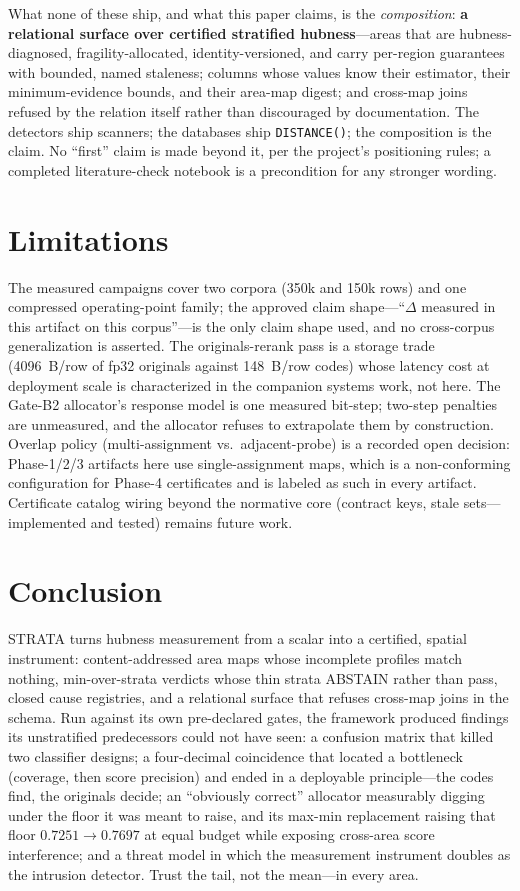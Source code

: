 \documentclass[sigconf, nonacm]{acmart}
\begin{document}
What none of these ship, and what this paper claims, is the
\emph{composition}: \textbf{a relational surface over certified stratified
hubness}---areas that are hubness-diagnosed, fragility-allocated,
identity-versioned, and carry per-region guarantees with bounded, named
staleness; columns whose values know their estimator, their
minimum-evidence bounds, and their area-map digest; and cross-map joins
refused by the relation itself rather than discouraged by documentation.
The detectors ship scanners; the databases ship \texttt{DISTANCE()}; the
composition is the claim. No ``first'' claim is made beyond it, per the
project's positioning rules; a completed literature-check notebook is a
precondition for any stronger wording.

\section{Limitations}
\label{sec:limitations}

The measured campaigns cover two corpora (350k and 150k rows) and one
compressed operating-point family; the approved claim shape---``$\Delta$
measured in this artifact on this corpus''---is the only claim shape used,
and no cross-corpus generalization is asserted. The originals-rerank pass
is a storage trade (4096~B/row of fp32 originals against 148~B/row codes)
whose latency cost at deployment scale is characterized in the companion
systems work, not here. The Gate-B2 allocator's response model is one
measured bit-step; two-step penalties are unmeasured, and the allocator
refuses to extrapolate them by construction. Overlap policy
(multi-assignment vs.\ adjacent-probe) is a recorded open decision:
Phase-1/2/3 artifacts here use single-assignment maps, which is a
non-conforming configuration for Phase-4 certificates and is labeled as
such in every artifact. Certificate catalog wiring beyond the normative
core (contract keys, stale sets---implemented and tested) remains future
work.

\section{Conclusion}
\label{sec:conclusion}

STRATA turns hubness measurement from a scalar into a certified, spatial
instrument: content-addressed area maps whose incomplete profiles match
nothing, min-over-strata verdicts whose thin strata ABSTAIN rather than
pass, closed cause registries, and a relational surface that refuses
cross-map joins in the schema. Run against its own pre-declared gates, the
framework produced findings its unstratified predecessors could not have
seen: a confusion matrix that killed two classifier designs; a
four-decimal coincidence that located a bottleneck (coverage, then score
precision) and ended in a deployable principle---the codes find, the
originals decide; an ``obviously correct'' allocator measurably digging
under the floor it was meant to raise, and its max-min replacement raising
that floor $0.7251 \to 0.7697$ at equal budget while exposing cross-area
score interference; and a threat model in which the measurement instrument
doubles as the intrusion detector. Trust the tail, not the mean---in every
area.
\end{document}
